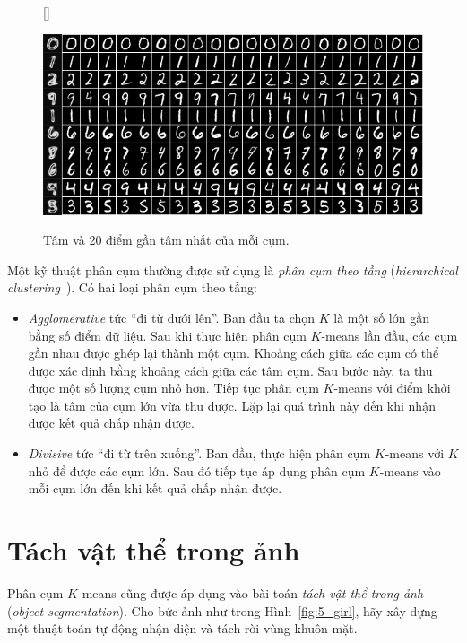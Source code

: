 \begin{figure}[t]
    [\FBwidth]
    {\caption{ 
    Tâm và 20 điểm gần tâm nhất của mỗi cụm.
    }
    \label{fig:5_knn}}
    { %
    \includegraphics[width=.65\textwidth]{Chapters/03_SimpleML/4_kmeans/kmeans_knn_gray.png}
    }
\end{figure}

Một kỹ thuật phân cụm thường được sử dụng là \textit{phân cụm theo
tầng} (\textit{hierarchical clustering}~\cite{blei2008hierarchical}). Có hai
loại phân cụm theo tầng:

\begin{itemize}
    \item \textit{Agglomerative} tức ``đi từ dưới lên''. Ban đầu ta chọn $K$ là một
    số lớn gần bằng số điểm dữ liệu. Sau khi thực hiện phân cụm $K$-means lần
    đầu, các cụm gần nhau được ghép lại thành một cụm. Khoảng cách giữa các cụm có thể được xác định bằng khoảng cách giữa các tâm cụm. Sau bước này, ta thu được một
    số lượng cụm nhỏ hơn. Tiếp tục phân cụm $K$-means với điểm khởi tạo
    là tâm của cụm lớn vừa thu được. Lặp lại quá trình này đến khi nhận
    được kết quả chấp nhận được.

    \item \textit{Divisive} tức ``đi từ trên xuống''. Ban đầu, thực hiện phân
    cụm $K$-means với $K$ nhỏ để được các cụm lớn. Sau đó tiếp tục áp dụng phân cụm $K$-means vào mỗi cụm lớn đến khi kết quả chấp nhận được.

\end{itemize}

\section{Tách vật thể trong ảnh}


Phân cụm $K$-means cũng được áp dụng vào bài toán \textit{tách vật thể trong ảnh} (\textit{object segmentation}). Cho bức ảnh như trong Hình~\ref{fig:5_girl}, hãy xây dựng một thuật toán tự động nhận diện và tách rời vùng khuôn mặt.


